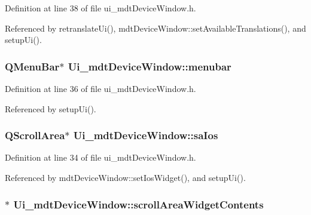 Definition at line 38 of file ui\-\_\-mdt\-Device\-Window.\-h.



Referenced by retranslate\-Ui(), mdt\-Device\-Window\-::set\-Available\-Translations(), and setup\-Ui().

\hypertarget{class_ui__mdt_device_window_add99fb8eb3acdf89f4f2fca08313e356}{
\subsubsection[{menubar}]{\setlength{\rightskip}{0pt plus 5cm}Q\-Menu\-Bar$\ast$ Ui\-\_\-mdt\-Device\-Window\-::menubar}}\label{class_ui__mdt_device_window_add99fb8eb3acdf89f4f2fca08313e356}


Definition at line 36 of file ui\-\_\-mdt\-Device\-Window.\-h.



Referenced by setup\-Ui().

\hypertarget{class_ui__mdt_device_window_a20450234862772ffcf7d6ca5ba903aa1}{
\subsubsection[{sa\-Ios}]{\setlength{\rightskip}{0pt plus 5cm}Q\-Scroll\-Area$\ast$ Ui\-\_\-mdt\-Device\-Window\-::sa\-Ios}}\label{class_ui__mdt_device_window_a20450234862772ffcf7d6ca5ba903aa1}


Definition at line 34 of file ui\-\_\-mdt\-Device\-Window.\-h.



Referenced by mdt\-Device\-Window\-::set\-Ios\-Widget(), and setup\-Ui().

\hypertarget{class_ui__mdt_device_window_a3389de056f2567855e29bc37becf052e}{
\subsubsection[{scroll\-Area\-Widget\-Contents}]{$\ast$ Ui\-\_\-mdt\-Device\-Window\-::scroll\-Area\-Widget\-Contents}}\label{class_ui__mdt_device_window_a3389de056f2567855e29bc37becf052e}


